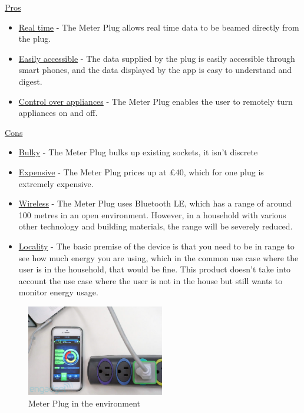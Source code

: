 \documentclass[preprint,12pt,3p]{elsarticle}
\begin{document}
\begin{center}
    \underline{Pros}
    \begin{itemize}
      \item \underline{Real time} - The Meter Plug allows real time data to be beamed directly from the plug. 
      \item \underline{Easily accessible} - The data supplied by the plug is easily accessible through smart phones, and the data displayed by the app is easy to understand and digest.
      \item \underline{Control over appliances} - The Meter Plug enables the user to remotely turn appliances on and off.
    \end{itemize}
    
    \underline{Cons}
    
    \begin{itemize}
      \item \underline{Bulky} - The Meter Plug bulks up existing sockets, it isn't discrete
      \item \underline{Expensive} - The Meter Plug prices up at \pounds40, which for one plug is extremely expensive. 
      \item \underline{Wireless} - The Meter Plug uses Bluetooth LE, which has a range of around 100 metres in an open environment. However, in a household with various other technology and building materials, the range will be severely reduced.
      \item \underline{Locality} - The basic premise of the device is that you need to be in range to see how much energy you are using, which in the common use case where the user is in the household, that would be fine. This product doesn't take into account the use case where the user is not in the house but still wants to monitor energy usage.
    \end{itemize}
    
\end{center}


\begin{figure}[h]
    \centering
    \includegraphics[width=6cm]{existing/meterplug}
    \caption {Meter Plug in the environment}
\end{figure}
\end{document}
